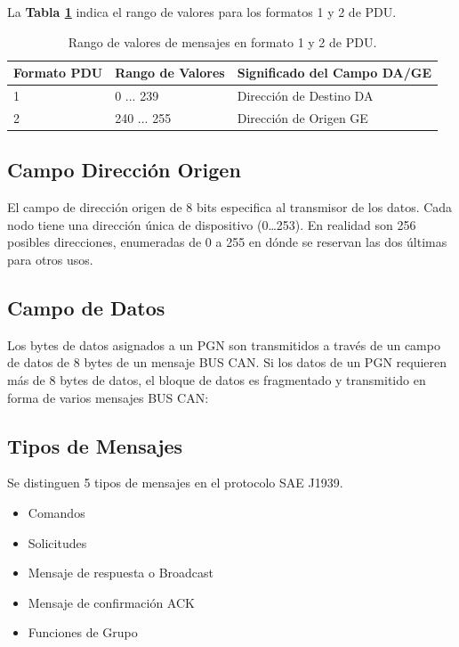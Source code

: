 La \textbf{Tabla \ref{rango}} indica el rango de valores para los formatos 1 y 2 de PDU.
\begin{table}[htb]
\begin{center}
\begin{tabular}{|l|l|l|}
\hline
Formato PDU & Rango de Valores & Significado del Campo DA/GE \\
\hline \hline \hline
1 &   0 ... 239 & Dirección de Destino DA\\ \hline
2 & 240 ... 255 & Dirección de Origen GE\\ \hline
\end{tabular}
\caption{Rango de valores de mensajes en formato 1 y 2 de PDU.}
\label{rango}
\end{center}
\end{table}


\subsection{Campo Dirección Origen}

El campo de dirección origen de 8 bits especifica al transmisor de los datos. Cada nodo tiene una dirección única de dispositivo (0…253). En realidad son 256 posibles direcciones, enumeradas de 0 a 255 en dónde se reservan las dos últimas para otros usos.

\subsection{Campo de Datos}
Los bytes de datos asignados a un PGN son transmitidos a través de un campo de datos de 8 bytes de un mensaje BUS CAN. Si los datos de un PGN requieren más de 8 bytes de datos, el bloque de datos es fragmentado y transmitido en forma de varios mensajes BUS CAN:

\subsection{Tipos de Mensajes}
Se distinguen 5 tipos de mensajes en el protocolo SAE J1939.
\begin{itemize}
\item Comandos
\item Solicitudes
\item Mensaje de respuesta o Broadcast
\item Mensaje de confirmación  ACK
\item Funciones de Grupo
\end{itemize}

